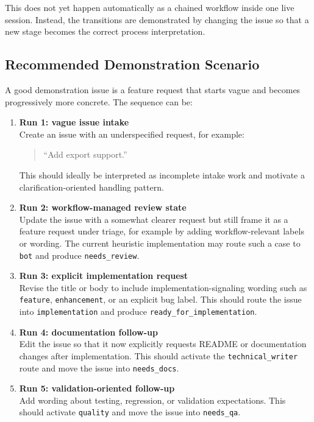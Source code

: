 \documentclass[11pt,a4paper]{article}
\begin{document}
This does not yet happen automatically as a chained workflow inside one live session. Instead, the transitions are demonstrated by changing the issue so that a new stage becomes the correct process interpretation.

\subsection{Recommended Demonstration Scenario}

A good demonstration issue is a feature request that starts vague and becomes progressively more concrete. The sequence can be:

\begin{enumerate}
    \item \textbf{Run 1: vague issue intake} \\
    Create an issue with an underspecified request, for example:
    \begin{quote}
    ``Add export support.''
    \end{quote}
    This should ideally be interpreted as incomplete intake work and motivate a clarification-oriented handling pattern.

    \item \textbf{Run 2: workflow-managed review state} \\
    Update the issue with a somewhat clearer request but still frame it as a feature request under triage, for example by adding workflow-relevant labels or wording. The current heuristic implementation may route such a case to \texttt{bot} and produce \texttt{needs\_review}.

    \item \textbf{Run 3: explicit implementation request} \\
    Revise the title or body to include implementation-signaling wording such as \texttt{feature}, \texttt{enhancement}, or an explicit bug label. This should route the issue into \texttt{implementation} and produce \texttt{ready\_for\_implementation}.

    \item \textbf{Run 4: documentation follow-up} \\
    Edit the issue so that it now explicitly requests README or documentation changes after implementation. This should activate the \texttt{technical\_writer} route and move the issue into \texttt{needs\_docs}.

    \item \textbf{Run 5: validation-oriented follow-up} \\
    Add wording about testing, regression, or validation expectations. This should activate \texttt{quality} and move the issue into \texttt{needs\_qa}.
\end{enumerate}
\end{document}
